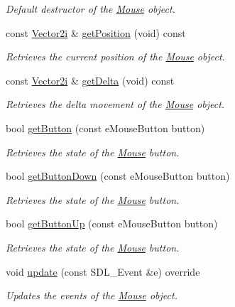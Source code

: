 \begin{DoxyCompactItemize}
\begin{DoxyCompactList}\small\item\em Default destructor of the \hyperlink{classsparky_1_1_mouse}{Mouse} object. \end{DoxyCompactList}\item 
const \hyperlink{classsparky_1_1_vector2}{Vector2i} \& \hyperlink{classsparky_1_1_mouse_aa8da85cc079222bccdd15d74e92b89af}{get\+Position} (void) const 
\begin{DoxyCompactList}\small\item\em Retrieves the current position of the \hyperlink{classsparky_1_1_mouse}{Mouse} object. \end{DoxyCompactList}\item 
const \hyperlink{classsparky_1_1_vector2}{Vector2i} \& \hyperlink{classsparky_1_1_mouse_ad488d7a41b63737baf4e4e7a398d2db2}{get\+Delta} (void) const 
\begin{DoxyCompactList}\small\item\em Retrieves the delta movement of the \hyperlink{classsparky_1_1_mouse}{Mouse} object. \end{DoxyCompactList}\item 
bool \hyperlink{classsparky_1_1_mouse_ac4ed3ae2df7d0a0d01f3fae6a0f0325f}{get\+Button} (const e\+Mouse\+Button button)
\begin{DoxyCompactList}\small\item\em Retrieves the state of the \hyperlink{classsparky_1_1_mouse}{Mouse} button. \end{DoxyCompactList}\item 
bool \hyperlink{classsparky_1_1_mouse_acb7c74fe43bfb85d9b8f94c25024cdc0}{get\+Button\+Down} (const e\+Mouse\+Button button)
\begin{DoxyCompactList}\small\item\em Retrieves the state of the \hyperlink{classsparky_1_1_mouse}{Mouse} button. \end{DoxyCompactList}\item 
bool \hyperlink{classsparky_1_1_mouse_a52f0c26e5f444050400fc1c44aac00e4}{get\+Button\+Up} (const e\+Mouse\+Button button)
\begin{DoxyCompactList}\small\item\em Retrieves the state of the \hyperlink{classsparky_1_1_mouse}{Mouse} button. \end{DoxyCompactList}\item 
void \hyperlink{classsparky_1_1_mouse_a92e5375b15d10af6ea4d3f29f9b373bd}{update} (const S\+D\+L\+\_\+\+Event \&e) override
\begin{DoxyCompactList}\small\item\em Updates the events of the \hyperlink{classsparky_1_1_mouse}{Mouse} object. \end{DoxyCompactList}\end{DoxyCompactItemize}
